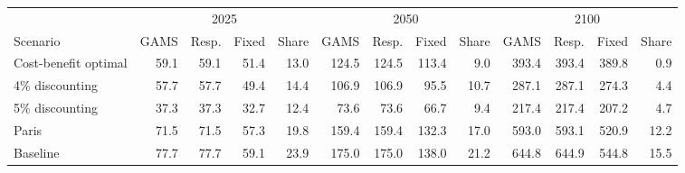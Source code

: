 \begin{tabular}{lrrrrrrrrrrrr}
\toprule
 & \multicolumn{4}{c}{2025} & \multicolumn{4}{c}{2050} & \multicolumn{4}{c}{2100} \\
\cmidrule(lr){2-5}\cmidrule(lr){6-9}\cmidrule(lr){10-13}
Scenario & GAMS & Resp. & Fixed & Share & GAMS & Resp. & Fixed & Share & GAMS & Resp. & Fixed & Share \\
\midrule
Cost-benefit optimal & 59.1 & 59.1 & 51.4 & 13.0 & 124.5 & 124.5 & 113.4 & 9.0 & 393.4 & 393.4 & 389.8 & 0.9 \\
4\% discounting & 57.7 & 57.7 & 49.4 & 14.4 & 106.9 & 106.9 & 95.5 & 10.7 & 287.1 & 287.1 & 274.3 & 4.4 \\
5\% discounting & 37.3 & 37.3 & 32.7 & 12.4 & 73.6 & 73.6 & 66.7 & 9.4 & 217.4 & 217.4 & 207.2 & 4.7 \\
Paris & 71.5 & 71.5 & 57.3 & 19.8 & 159.4 & 159.4 & 132.3 & 17.0 & 593.0 & 593.1 & 520.9 & 12.2 \\
Baseline & 77.7 & 77.7 & 59.1 & 23.9 & 175.0 & 175.0 & 138.0 & 21.2 & 644.8 & 644.9 & 544.8 & 15.5 \\
\bottomrule
\end{tabular}
